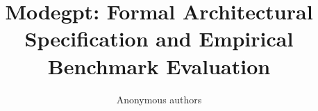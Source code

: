 \title{\textbf{Modegpt: Formal Architectural Specification and Empirical Benchmark Evaluation}}

\author{Anonymous authors}
